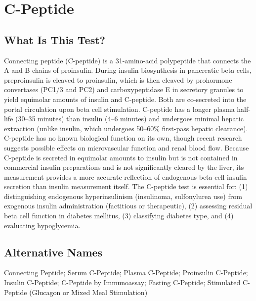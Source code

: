 \chapter{C-Peptide}

\section*{What Is This Test?}
Connecting peptide (C-peptide) is a 31-amino-acid polypeptide that connects the A and B chains of proinsulin. During insulin biosynthesis in pancreatic beta cells, preproinsulin is cleaved to proinsulin, which is then cleaved by prohormone convertases (PC1/3 and PC2) and carboxypeptidase E in secretory granules to yield equimolar amounts of insulin and C-peptide. Both are co-secreted into the portal circulation upon beta cell stimulation. C-peptide has a longer plasma half-life (30--35 minutes) than insulin (4--6 minutes) and undergoes minimal hepatic extraction (unlike insulin, which undergoes 50--60\% first-pass hepatic clearance). C-peptide has no known biological function on its own, though recent research suggests possible effects on microvascular function and renal blood flow. Because C-peptide is secreted in equimolar amounts to insulin but is not contained in commercial insulin preparations and is not significantly cleared by the liver, its measurement provides a more accurate reflection of endogenous beta cell insulin secretion than insulin measurement itself. The C-peptide test is essential for: (1) distinguishing endogenous hyperinsulinism (insulinoma, sulfonylurea use) from exogenous insulin administration (factitious or therapeutic), (2) assessing residual beta cell function in diabetes mellitus, (3) classifying diabetes type, and (4) evaluating hypoglycemia.

\section*{Alternative Names}
Connecting Peptide; Serum C-Peptide; Plasma C-Peptide; Proinsulin C-Peptide; Insulin C-Peptide; C-Peptide by Immunoassay; Fasting C-Peptide; Stimulated C-Peptide (Glucagon or Mixed Meal Stimulation)

